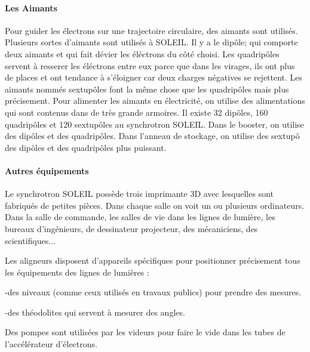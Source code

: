 			\paragraph{Les Aimants}
				Pour guider les électrons sur une trajectoire circulaire, des aimants sont utilisés. Plusieurs sortes d'aimants sont utilisés à SOLEIL. Il y a le dipôle; qui comporte deux aimants et qui fait dévier les éléctrons du côté choisi. Les quadripôles servent à resserer les éléctrons entre eux parce que dans les virages, ils ont plus de places et ont tendance à s'éloigner car deux charges négatives se rejettent. Les aimants nommés sextupôles font la même chose que les quadripôles mais plus précisement. Pour alimenter les aimants en électricité, on utilise des alimentations qui sont contenus dans de très grande armoires. Il existe 32 dipôles, 160 quadripôles et 120 sextupôles au synchrotron SOLEIL. Dans le booster, on utilise des dipôles et des quadripôles.
				Dans l'anneau de stockage, on utilise des sextupô des dipôles et des quadripôles plus puissant. 
			
			\paragraph{Autres équipements}
				Le synchrotron SOLEIL possède trois imprimante 3D avec lesquelles sont fabriqués de petites pièces. Dans chaque salle on voit un ou plusieurs ordinateurs. Dans la salle de commande, les salles de vie dans les lignes de lumière, les bureaux d'ingénieurs, de dessinateur projecteur, des mécaniciens, des scientifiques... 

				Les aligneurs disposent d'appareils spécifiques pour positionner précisement tous les équipements des lignes de lumières :

				 -des niveaux (comme ceux utilisés en travaux publics) pour prendre des mesures.
				 
				 -des théodolites qui servent à mesurer des angles.
				
				Des pompes sont utilisées par les videurs pour faire le vide dans les tubes de l'accélérateur d'électrons.





%
%